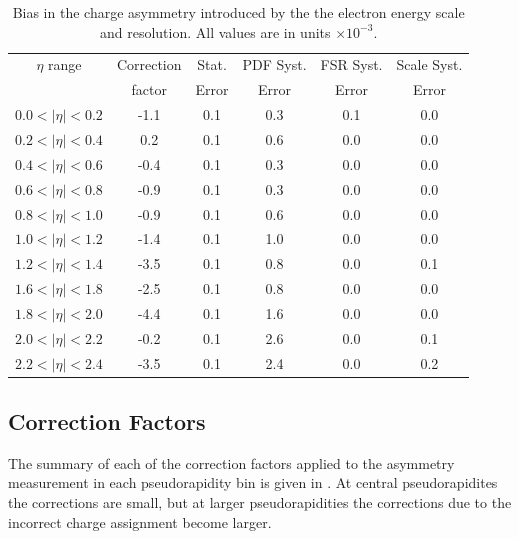 \begin{table}[htbp]
  \begin{center}
    \begin{tabular}{cccccc}
\toprule
$\eta$ range & Correction  & Stat.   &PDF  Syst. &  FSR Syst. & Scale Syst.\\
          & factor & Error & Error   & Error  & Error  \\
     \midrule
 $0.0<|\eta|<0.2$ & -1.1 & 0.1 & 0.3  &0.1 & 0.0\\
 $0.2<|\eta|<0.4$ &  0.2 & 0.1 & 0.6  &0.0 & 0.0\\
 $0.4<|\eta|<0.6$ & -0.4 & 0.1 & 0.3  &0.0 & 0.0\\
 $0.6<|\eta|<0.8$ & -0.9 & 0.1 & 0.3  &0.0 & 0.0\\
 $0.8<|\eta|<1.0$ & -0.9 & 0.1 & 0.6  &0.0 & 0.0\\
 $1.0<|\eta|<1.2$ & -1.4 & 0.1 & 1.0  &0.0 & 0.0\\
 $1.2<|\eta|<1.4$ & -3.5 & 0.1 & 0.8  &0.0 & 0.1\\
 $1.6<|\eta|<1.8$ & -2.5 & 0.1 & 0.8  &0.0 & 0.0\\
 $1.8<|\eta|<2.0$ & -4.4 & 0.1 & 1.6  &0.0 & 0.0\\
 $2.0<|\eta|<2.2$ & -0.2 & 0.1 & 2.6  &0.0 & 0.1\\
 $2.2<|\eta|<2.4$ & -3.5 & 0.1 & 2.4  &0.0 & 0.2\\
\bottomrule
    \end{tabular}
    \caption{\label{tab:energyscalecorr}Bias in the charge asymmetry introduced by the the electron energy scale and resolution.
 All values are in units $\times 10^{-3}$\cite{bendavid2011electron}.}
  \end{center}
\end{table}

\subsection{Correction Factors}
The summary of each of the correction factors applied to the asymmetry
measurement in each pseudorapidity bin is given in
. At central pseudorapidites the corrections are
small, but at larger pseudorapidities the corrections due to the incorrect
charge assignment become larger.

